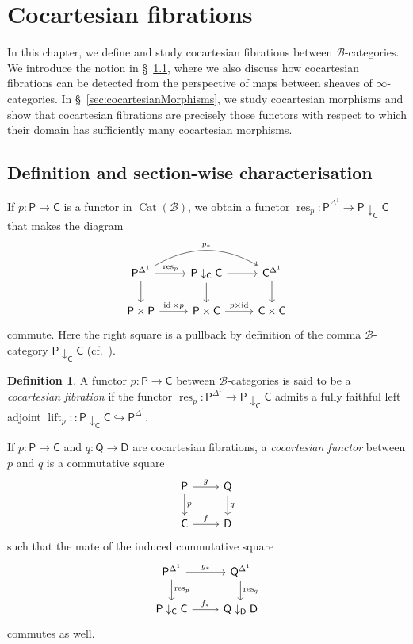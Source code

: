 \documentclass[reqno]{amsart}
\numberwithin{equation}{subsection}
\theoremstyle{plain}
\theoremstyle{definition}
\newtheorem{definition}[equation]{Definition}
\let\scr=\mathcal
\let\into=\hookrightarrow
\def\BB{\scr B}
\DeclareMathOperator{\id}{id}
\DeclareMathOperator{\Cat}{Cat}
\DeclareMathOperator{\res}{res}
\DeclareMathOperator{\lift}{lift}
\newcommand{\I}[1]{\mathsf{#1}}
\newcommand{\Comma}[3]{{#1}\downarrow_{#2}{#3}}
\begin{document}
\section{Cocartesian fibrations}
\label{sec:CocartesianFibrations}
In this chapter, we define and study cocartesian fibrations between $\BB$-categories. We introduce the notion in \S~\ref{sec:Definitions}, where we also discuss how cocartesian fibrations can be detected from the perspective of maps between sheaves of $\infty$-categories. In \S~\ref{sec:cocartesianMorphisms}, we study cocartesian morphisms and show that cocartesian fibrations are precisely those functors with respect to which their domain has sufficiently  many cocartesian morphisms.
\subsection{Definition and section-wise characterisation}
\label{sec:Definitions}
If $p\colon\I{P}\to\I{C}$ is a functor in $\Cat(\BB)$, we obtain a functor $\res_p\colon\I{P}^{\Delta^1}\to\Comma{\I{P}}{\I{C}}{\I{C}}$ that makes the diagram
\begin{equation*}
	\begin{tikzcd}
	\I{P}^{\Delta^1}\arrow[d]\arrow[r, "\res_p"]\arrow[rr, bend left, "p_\ast"] & \Comma{\I{P}}{\I{C}}{\I{C}}\arrow[r]\arrow[d] & \I{C}^{\Delta^1}\arrow[d]\\
	\I{P}\times\I{P}\arrow[r, "\id\times p"] & \I{P}\times\I{C}\arrow[r, "p\times\id"] & \I{C}\times\I{C}
	\end{tikzcd}
\end{equation*}
commute. Here the right square is a pullback by definition of the comma $\BB$-category $\Comma{\I{P}}{\I{C}}{\I{C}}$ (cf.~\cite[\S~4.2]{Martini2021}).
\begin{definition}
	\label{def:cocartesianFibration}
	A functor $p\colon \I{P}\to\I{C}$ between $\BB$-categories is said to be a \emph{cocartesian fibration} if the functor $\res_p\colon \I{P}^{\Delta^1}\to \Comma{\I{P}}{\I{C}}{\I{C}}$ admits a fully faithful left adjoint $\lift_p\colon\colon \Comma{\I{P}}{\I{C}}{\I{C}}\into\I{P}^{\Delta^1}$. 
	
	If $p\colon \I{P}\to\I{C}$ and $q\colon \I{Q}\to\I{D}$ are cocartesian fibrations, a \emph{cocartesian functor} between $p$ and $q$ is a commutative square
	\begin{equation*}
	\begin{tikzcd}
		\I{P}\arrow[d, "p"]\arrow[r, "g"] & \I{Q}\arrow[d, "q"]\\
		\I{C}\arrow[r, "f"] & \I{D}
	\end{tikzcd}
	\end{equation*}
	such that the mate of the induced commutative square
	\begin{equation*}
			\begin{tikzcd}
				\I{P}^{\Delta^1}\arrow[d, "\res_p"] \arrow[r, "g_\ast"] & \I{Q}^{\Delta^1}\arrow[d, "\res_q"]\\
				\Comma{\I{P}}{\I{C}}{\I{C}}\arrow[r, "f_\ast"] & \Comma{\I{Q}}{\I{D}}{\I{D}}
			\end{tikzcd}
	\end{equation*}
	commutes as well.
\end{definition}
\end{document}
